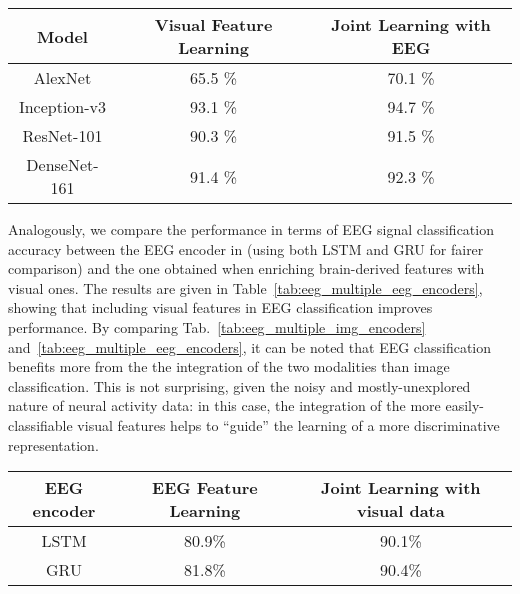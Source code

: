 \documentclass[10pt,journal,compsoc,twocolumn]{IEEEtran}
\begin{document}
\begin{table*}
	\centering
	\begin{tabular}{ccc}
		\toprule
		Model &\textbf{Visual Feature Learning} & \textbf{Joint Learning with EEG} \\
		\midrule
		AlexNet 		& 65.5 \% &  70.1 \%  \\
		Inception-v3 	& 93.1 \% &  94.7 \%  \\
		ResNet-101 		& 90.3 \% &  91.5 \%  \\
		DenseNet-161 	& 91.4 \% &  92.3 \%  \\
\bottomrule
	\end{tabular}
	\caption{Comparison of image classification performance when using only visual features and when using joint neural-visual features. For each model, we report the best performance according to Tab.~\ref{tab:class_base}}
	\label{tab:eeg_multiple_img_encoders}
\end{table*}
Analogously, we compare the performance in terms of EEG signal classification accuracy between the EEG encoder in \cite{Spampinato2016deep} (using both LSTM and GRU for fairer comparison) and the one obtained when enriching brain-derived features with visual ones. The results are given in Table~\ref{tab:eeg_multiple_eeg_encoders}, showing that including visual features in EEG classification improves performance.  By comparing Tab.~\ref{tab:eeg_multiple_img_encoders} and~\ref{tab:eeg_multiple_eeg_encoders}, it can be noted that EEG classification benefits more from the the integration of the two modalities than image classification. This is not surprising, given the noisy and mostly-unexplored nature of neural activity data: in this case, the integration of the more easily-classifiable visual features helps to ``guide'' the learning of a more discriminative representation.

\begin{table*}
	\centering
	\begin{tabular}{ccc}
	\toprule
	\textbf{EEG encoder} & \textbf{EEG Feature Learning} & \textbf{Joint Learning with visual data}\\
	\midrule
	LSTM    &   80.9\% & 90.1\%\\
	GRU 	&   81.8\% & 90.4\%\\
	\bottomrule
\end{tabular}
	\caption{Comparison of EEG classification performance when using only neural features and when using joint neural-visual features. The reported EEG classifcation performance for our approach are those achieved when training the image encoder using Inception-v3, as it gave the highest average accuracy according to Tab. \ref{tab:class_base}.} 
	\label{tab:eeg_multiple_eeg_encoders}
\end{table*}
\end{document}
